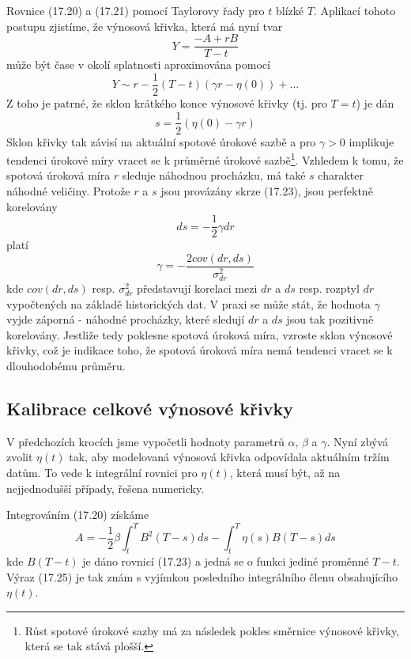 \documentclass[a4paper]{book}
\begin{document}
Rovnice (17.20) a (17.21) pomocí Taylorovy řady pro $t$ blízké $T$. Aplikací tohoto postupu zjistíme, že výnosová křivka, která má nyní tvar
\begin{equation*}
Y = \frac{-A + rB}{T - t}
\end{equation*}
může být čase v okolí splatnosti aproximována pomocí
\begin{equation*}
Y \sim r - \frac{1}{2}(T - t)(\gamma r - \eta(0)) + ...
\end{equation*}
Z toho je patrné, že sklon krátkého konce výnosové křivky (tj. pro $T = t$) je dán
\begin{equation}
s = \frac{1}{2}(\eta(0) - \gamma r)
\end{equation}
Sklon křivky tak závisí na aktuální spotové úrokové sazbě a pro $\gamma > 0$ implikuje tendenci úrokové míry vracet se k průměrné úrokové sazbě\footnote{Růst spotové úrokové sazby má za následek pokles směrnice výnosové křivky, která se tak stává plošší.}. Vzhledem k tomu, že spotová úroková míra $r$ sleduje náhodnou procházku, má také $s$ charakter náhodné veličiny. Protože $r$ a $s$ jsou provázány skrze (17.23), jsou perfektně korelovány
\begin{equation*}
ds = -\frac{1}{2}\gamma dr
\end{equation*}
platí
\begin{equation*}
\gamma = -\frac{2 cov(dr, ds)}{\sigma_{dr}^2}
\end{equation*}
kde $cov(dr, ds)$ resp. $\sigma_{dr}^2$ představují korelaci mezi $dr$ a $ds$ resp. rozptyl $dr$ vypočtených na základě historických dat. V praxi se může stát, že hodnota $\gamma$ vyjde záporná - náhodné procházky, které sledují $dr$ a $ds$ jsou tak pozitivně korelovány. Jestliže tedy poklesne spotová úroková míra, vzroste sklon výnosové křivky, což je indikace toho, že spotová úroková míra nemá tendenci vracet se k dlouhodobému průměru.

\subsection{Kalibrace celkové výnosové křivky}

V předchozích krocích jsme vypočetli hodnoty parametrů $\alpha$, $\beta$ a $\gamma$. Nyní zbývá zvolit $\eta(t)$ tak, aby modelovaná výnosová křivka odpovídala aktuálním tržím datům. To vede k integrální rovnici pro $\eta(t)$, která musí být, až na nejjednodušší případy, řešena numericky.

Integrováním (17.20) získáme
\begin{equation}
A = - \frac{1}{2}\beta \int_t^T B^2 (T - s) ds - \int_t^T \eta(s)B(T-s)ds
\end{equation}
kde $B(T-t)$ je dáno rovnicí (17.23) a jedná se o funkci jediné proměnné $T-t$. Výraz (17.25) je tak znám s vyjímkou posledního integrálního členu obsahujícího $\eta(t)$.
\end{document}
